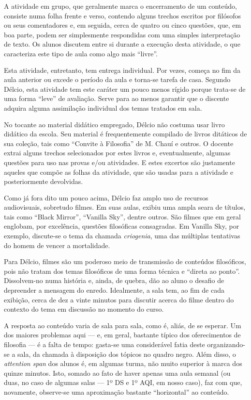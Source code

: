 \documentclass[12pt,a4paper]{article}
\begin{document}
    A atividade em grupo, que geralmente marca o encerramento de um conteúdo, 
    consiste numa folha frente e verso, contendo alguns trechos escritos por 
    filósofos ou seus comentadores e, em seguida, cerca de quatro ou cinco 
    questões, que, em boa parte, podem ser simplesmente respondidas com 
    uma simples interpretação de texto. Os alunos discutem entre si durante 
    a execução desta atividade, o que caracteriza este tipo de aula como algo 
    mais ``livre''. 
    
    Esta atividade, entretanto, tem entrega individual. Por vezes, começa no 
    fim da aula anterior ou excede o período da aula e torna-se tarefa de casa. 
    Segundo Délcio, esta atividade tem este caráter um pouco menos rígido 
    porque trata-se de uma forma ``leve'' de avaliação. Serve para ao menos 
    garantir que o discente adquira alguma assimilação individual dos temas 
    tratados em sala. 
    
    No tocante ao material didático empregado, Délcio não costuma usar livro 
    didático da escola. Seu material é frequentemente compilado de livros 
    ditáticos de sua coleção, tais como ``Convite à Filosofia'' de M. Chauí e 
    outros. O docente extrai alguns trechos 
    selecionados por estes livros e, eventualmente, algumas questões para uso 
    nas provas e/ou atividades. E estes excertos são justamente aqueles que 
    compõe as folhas da atividade, que são usadas para a atividade e 
    posteriormente devolvidas. 
    
    Como já fora dito um pouco acima, Délcio faz amplo uso de recursos 
    audiovisuais, sobretudo filmes. Em suas aulas, exibiu uma ampla seara 
    de títulos, tais como ``Black Mirror'', ``Vanilla Sky'', dentre outros. 
    São filmes que em geral englobam, por excelência, questões filosóficas 
    consagradas. Em Vanilla Sky, por exemplo, discute-se o tema da chamada 
    \textit{criogenia}, uma das múltiplas tentativas do homem de vencer a 
    mortalidade. 
    
    Para Délcio, filmes são um poderoso meio de transmissão de conteúdos 
    filosóficos, pois não tratam dos temas filosóficos de uma forma técnica e 
    ``direta ao ponto''. Dissolvem-no numa história e, ainda, de quebra, dão ao 
    aluno o desafio de depreender a mensagem do enredo. Idealmente, a sala tem, 
    ao fim de cada exibição, cerca de dez a vinte minutos para discutir acerca 
    do filme dentro do contexto do tema em discussão no momento do curso. 
    
    A resposta ao conteúdo varia de sala para sala, como é, aliás, de se 
    esperar. Um dos maiores problemas aqui --- e, em geral, bastante típico 
    dos oferecimentos de filosofia --- é a falta de tempo: gasta-se 
    uma considerável fatia deste organizando-se a sala, da chamada à disposição 
    dos tópicos no quadro negro. Além disso, o \textit{attention span} dos 
    alunos é, em algumas turma, não muito superior à marca dos quinze minutos. 
    Isto, somado ao fato de haver apenas uma aula semanal (ou duas, no caso de 
    algumas salas --- 1º DS e 1º AQI, em nosso caso), faz com que, novamente, 
    observe-se uma aproximação bastante ``horizontal'' ao conteúdo. 
    	
\end{document}
